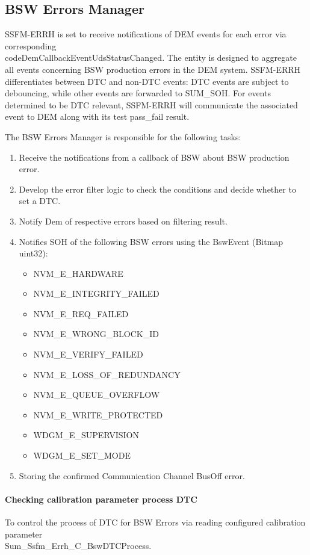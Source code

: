 \subsection{BSW Errors Manager}
\label{subsec:BSWErrorsManager}

SSFM-ERRH is set to receive notifications of DEM events for each error via corresponding \\code{DemCallbackEventUdsStatusChanged}. The entity is designed to aggregate all events concerning BSW production errors in the DEM system. 
SSFM-ERRH differentiates between DTC and non-DTC events: DTC events are subject to debouncing, while other events are forwarded to SUM\_SOH. 
For events determined to be DTC relevant, SSFM-ERRH will communicate the associated event to DEM along with its test pass\_fail result.

The BSW Errors Manager is responsible for the following tasks:

\begin{enumerate}
    \item Receive the notifications from a callback of BSW about BSW production error.
	\item Develop the error filter logic to check the conditions and decide whether to set a DTC.
    \item Notify Dem of respective errors based on filtering result.
	\item Notifies SOH of the following BSW errors using the BswEvent (Bitmap uint32):
	\begin{itemize}	
		\item NVM\_E\_HARDWARE
		\item NVM\_E\_INTEGRITY\_FAILED
		\item NVM\_E\_REQ\_FAILED
		\item NVM\_E\_WRONG\_BLOCK\_ID
		\item NVM\_E\_VERIFY\_FAILED
		\item NVM\_E\_LOSS\_OF\_REDUNDANCY
		\item NVM\_E\_QUEUE\_OVERFLOW
		\item NVM\_E\_WRITE\_PROTECTED
		\item WDGM\_E\_SUPERVISION
		\item WDGM\_E\_SET\_MODE
	\end{itemize}
	\item Storing the confirmed Communication Channel BusOff error.
\end{enumerate}

\paragraph{Checking calibration parameter process DTC} 
To control the process of DTC for BSW Errors via reading configured calibration parameter \\Sum\_Ssfm\_Errh\_C\_BswDTCProcess.

